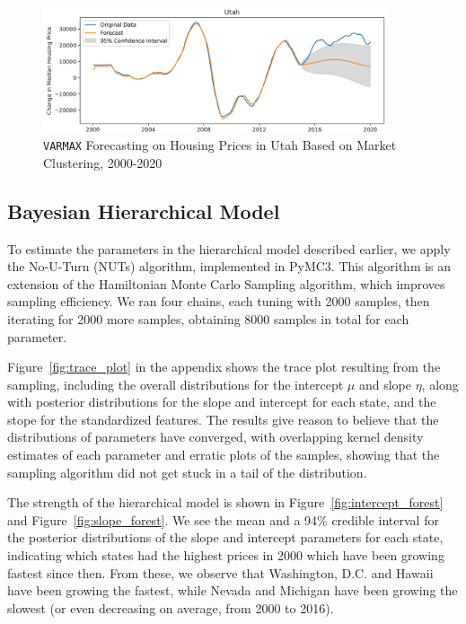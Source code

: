 \documentclass[11pt]{amsart}
\begin{document}
\begin{figure}[htbp]
    \centering
        \centering
        \includegraphics[width=4in]{figures/utah_varmax.png}
        \caption{\texttt{VARMAX} Forecasting on Housing Prices in Utah Based on Market Clustering, 2000-2020}
        \label{fig:utah varmax}

\end{figure}


\subsection{Bayesian Hierarchical Model}
To estimate the parameters in the hierarchical model described earlier, we apply the No-U-Turn (NUTs) algorithm, implemented in PyMC3.
This algorithm is an extension of the Hamiltonian Monte Carlo Sampling algorithm, which improves sampling efficiency.
We ran four chains, each tuning with 2000 samples, then iterating for 2000 more samples, obtaining 8000 samples in total for each parameter.

Figure~\ref{fig:trace_plot} in the appendix shows the trace plot resulting from the sampling, including the overall distributions for the intercept $\mu$ and slope $\eta$, along with posterior distributions for the slope and intercept for each state, and the stope for the standardized features.
The results give reason to believe that the distributions of parameters have converged, with overlapping kernel density estimates of each parameter and erratic plots of the samples, showing that the sampling algorithm did not get stuck in a tail of the distribution.

The strength of the hierarchical model is shown in Figure~\ref{fig:intercept_forest} and Figure~\ref{fig:slope_forest}.
We see the mean and a 94\% credible interval for the posterior distributions of the slope and intercept parameters for each state, indicating which states had the highest prices in 2000 which have been growing fastest since then.
From these, we observe that Washington, D.C. and Hawaii have been growing the fastest, while Nevada and Michigan have been growing the slowest (or even decreasing on average, from 2000 to 2016).
\end{document}
